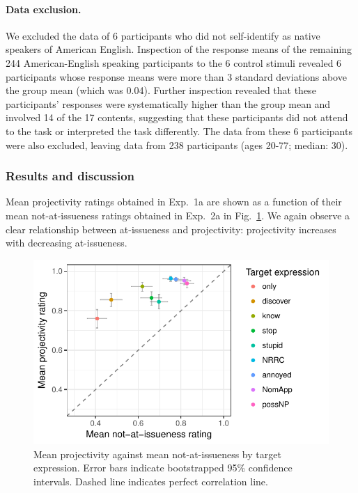 \documentclass[11pt,fleqn]{article}
\newcommand{\6}{\mbox{$[\hspace*{-.6mm}[$}}
\newcommand{\9}{\mbox{$]\hspace*{-.6mm}]$}}
\newcommand{\figref}[1]{Fig.~\ref{#1}}
\begin{document}
\paragraph{Data exclusion.} We excluded the data of 6 participants who did not self-identify as native speakers of American English. Inspection of the response means of the remaining 244 American-English speaking participants to the 6 control stimuli revealed 6 participants whose response means were more than 3 standard deviations above the group mean (which was 0.04). Further inspection revealed that these participants' responses were systematically higher than the group mean and involved 14 of the 17 contents, suggesting that these participants did not attend to the task or interpreted the task differently. The data from these 6 participants were also excluded, leaving data from 238 participants (ages 20-77; median: 30).


\subsubsection{Results and discussion}

Mean projectivity ratings obtained in Exp.~1a are shown as a function of their mean not-at-issueness ratings obtained in Exp.~2a in \figref{fig:f-proj-ai-2a}. We again observe a clear relationship between at-issueness and projectivity: projectivity increases with decreasing at-issueness.

\begin{figure}[!h]

\begin{center}
\includegraphics[width=12cm]{../results/exp2a/graphs/ai-proj-bytrigger}
\end{center}

\caption{Mean projectivity against mean not-at-issueness by target expression. Error bars indicate bootstrapped 95\% confidence intervals. Dashed line indicates perfect correlation line.}
\label{fig:f-proj-ai-2a}
\end{figure}
\end{document}
